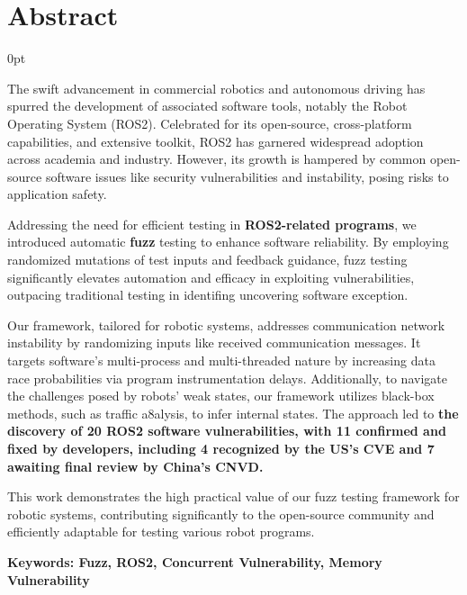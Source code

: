 \documentclass[zihao=-4]{ctexart}
\newcommand{\setParDis}{\setlength {\parskip} {0pt} }
\begin{document}
\section*{\textbf{Abstract}} %
\begin{spacing}{1.5}
\begin{adjustwidth}{0.42cm}{0.42cm}
\setParDis %

\noindent\hspace{\parindent}The swift advancement in commercial robotics and
autonomous driving has spurred the development of associated software tools,
notably the Robot Operating System (ROS2). Celebrated for its open-source,
cross-platform capabilities, and extensive toolkit, ROS2 has garnered widespread
adoption across academia and industry. However, its growth is hampered by common
open-source software issues like security vulnerabilities and instability,
posing risks to application safety.

Addressing the need for efficient testing in \textbf{ROS2-related programs}, we
introduced automatic \textbf{fuzz} testing to enhance software reliability. By
employing randomized mutations of test inputs and feedback guidance, fuzz
testing significantly elevates automation and efficacy in exploiting
vulnerabilities, outpacing traditional testing in identifing uncovering software
exception.

Our framework, tailored for robotic systems, addresses communication network
instability by randomizing inputs like received communication messages. It
targets software's multi-process and multi-threaded nature by increasing data
race probabilities via program instrumentation delays. Additionally, to navigate
the challenges posed by robots' weak states, our framework utilizes black-box
methods, such as traffic a8alysis, to infer internal states. The approach led to
\textbf{the discovery of 20 ROS2 software vulnerabilities, with 11 confirmed and
fixed by developers, including 4 recognized by the US's CVE and 7 awaiting final
review by China's CNVD.}

This work demonstrates the high practical value of our fuzz testing framework
for robotic systems, contributing significantly to the open-source community and
efficiently adaptable for testing various robot programs.

\textbf{Keywords: Fuzz, ROS2, Concurrent Vulnerability, Memory Vulnerability}
\end{adjustwidth}
\end{spacing}
\end{document}

